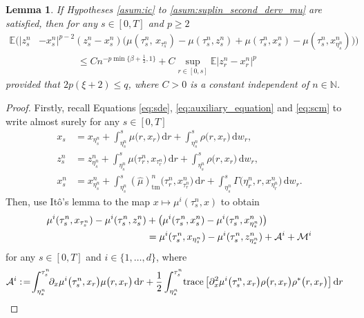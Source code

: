 \documentclass[reqno,  oneside, 12pt]{amsart}
\newtheorem{lemma}{Lemma}[section]
\DeclareMathOperator{\tr}{trace}
\newcommand{\E}{\mathbb E}
\begin{document}
\begin{lemma} \label{lem:mu}
	If  Hypotheses \mbox{\normalfont  \ref{asum:ic}}
	to \mbox{\normalfont  \ref{asum:suplin_second_derv_mu}}  are satisfied,
	then   for any $s \in [0, T]$ and $p\geq 2$ 
	\begin{align*}
		\E\Big(|z_s^n&-x_s^n|^{p-2}(z_s^n-x_s^n)\big(\mu(\tau^n_s,\,x_{\tau^n_s})-\mu(\tau^n_s,z_{s}^n)+ 	\mu(\tau^n_s,x_s^{n})-\mu(\tau^n_s,x_{\eta^n_s}^{n})\big)\Big)
		\\
		& \qquad\qquad \leq   Cn^{-p\min\{\beta+\frac{1}{2},1\}} + C\sup_{ r\in[0,s]}\E|z_r^n-x_r^n|^p
	\end{align*}
	provided that $2p(\xi+2)\leq q$, where  $C>0$ is a constant  independent of $n\in\mathbb N$.
\end{lemma}
\begin{proof}
	Firstly, 	recall Equations \eqref{eq:sde}, \eqref{eq:auxiliary_equation} and  \eqref{eq:scm} to write almost surely for any $s\in[0,T]$
	\begin{align*}
		x_{s}&= x_{\eta_s^n}+\int_{\eta_s^n}^{s}  \mu\big(r,x_{r}\big)\, \mathrm{d}r +\int_{\eta_s^n}^{s}   \rho\big(r,x_{r}\big)\, \mathrm{d}w_r,
		\\
		z_{s}^{n}&= z_{\eta_s^n}^{n}+\int_{\eta_s^n}^{s}  \mu\big(\tau^n_r,x_{\tau^n_r}\big)\, \mathrm{d}r +\int_{\eta_s^n}^{s}   \rho\big(r,x_{r}\big)\, \mathrm{d}w_r, 
		\\
		x_s^{n}&= x_{\eta_s^n}^n+\int_{\eta_s^n}^{s}  (\widehat\mu)_{\mathrm{tm}}^{n}\big(\tau^n_r,x_{\tau^n_r}^{n}\big)\, \mathrm{d}r +\int_{\eta_s^n}^{s} \Gamma\big(\eta^n_r,r,x_{\eta^n_r}^{n}\big)\, \mathrm{d}w_r.    
	\end{align*}
	Then, use  It\^o's  lemma \cite[Theorem 94]{Situ2006} to the map \( x \mapsto \mu^{i}(\tau^n_s, x) \) to obtain 
	\begin{align} 
		\mu^{i}(\tau^n_s,x_{\tau^n_s})-\mu^{i}(\tau^n_s,z_{s}^n)&+ \big(\mu^{i}(\tau^n_s,x_s^{n})-\mu^{i}(\tau^n_s,x_{\eta^n_s}^{n})\big) \notag
		\\
		&=\mu^{i}(\tau^n_s,x_{\eta^n_s})-\mu^{i}(\tau^n_s,z_{\eta^n_s}^n)+\mathcal A^i+\mathcal M^i \label{eq:A_M}
	\end{align}
	for any \( s \in [0,T] \) and $i\in\{1,\ldots,d\}$,	where 
	\begin{align} 
		\mathcal A^i:&\!= \!\int_{\eta^n_s}^{\tau^n_s}\!\!\partial_x \mu^{i}\big(\tau^n_s,x_{r}\big)\mu\big(r,x_{r}\big) \, \mathrm{d}r+ \frac{1}{2}\int_{\eta^n_s}^{\tau^n_s} \!\tr\big[\partial_{x}^2 \mu^{i}\big(\tau^n_s,x_{r}\big) 
		{\rho}\big(r,x_{r}\big){\rho}^*\big(r,x_{r}\big)\big]  \, \mathrm{d}r  \notag

\end{align}
\end{proof}
\end{document}
